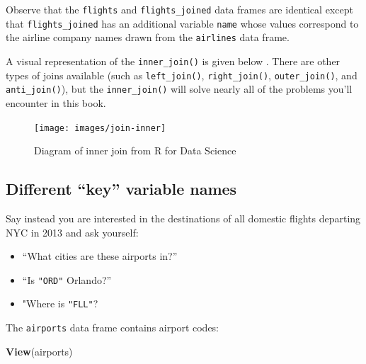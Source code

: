 \documentclass[12pt, krantz2,]{krantz}
\makeatletter
\newenvironment{Shaded}{\begin{snugshade}}{\end{snugshade}}
\newcommand{\DataTypeTok}[1]{\textcolor[rgb]{0.27,0.27,0.27}{#1}}
\newcommand{\KeywordTok}[1]{\textcolor[rgb]{0.27,0.27,0.27}{\textbf{#1}}}
\newcommand{\NormalTok}[1]{#1}
\newcommand{\OperatorTok}[1]{\textcolor[rgb]{0.43,0.43,0.43}{\textbf{#1}}}
\newcommand{\StringTok}[1]{\textcolor[rgb]{0.5,0.5,0.5}{#1}}
\providecommand{\tightlist}{%
  \setlength{\itemsep}{0pt}\setlength{\parskip}{0pt}}
\newenvironment{kframe}{%
\medskip{}
\setlength{\fboxsep}{.8em}
 \def\at@end@of@kframe{}%
 \ifinner\ifhmode%
  \def\at@end@of@kframe{\end{minipage}}%
  \begin{minipage}{\columnwidth}%
 \fi\fi%
 \def\FrameCommand##1{\hskip\@totalleftmargin \hskip-\fboxsep
 \colorbox{shadecolor}{##1}\hskip-\fboxsep
     \hskip-\linewidth \hskip-\@totalleftmargin \hskip\columnwidth}%
 \MakeFramed {\advance\hsize-\width
   \@totalleftmargin\z@ \linewidth\hsize
   \@setminipage}}%
 {\par\unskip\endMakeFramed%
 \at@end@of@kframe}
\renewenvironment{Shaded}{\begin{kframe}}{\end{kframe}}
\makeatother
\begin{document}
\begin{Shaded}
\end{Shaded}

Observe that the \texttt{flights} and \texttt{flights\_joined} data frames are identical except that \texttt{flights\_joined} has an additional variable \texttt{name} whose values correspond to the airline company names drawn from the \texttt{airlines} data frame.

A visual representation of the \texttt{inner\_join()} is given below \citep{rds2016}. There are other types of joins available (such as \texttt{left\_join()}, \texttt{right\_join()}, \texttt{outer\_join()}, and \texttt{anti\_join()}), but the \texttt{inner\_join()} will solve nearly all of the problems you'll encounter in this book.

\begin{figure}

{\centering \texttt{[image: images/join-inner]} 

}

\caption{Diagram of inner join from R for Data Science}\label{fig:ijdiagram}
\end{figure}

\hypertarget{diff-key}{%
\subsection{Different ``key'' variable names}\label{diff-key}}

Say instead you are interested in the destinations of all domestic flights departing NYC in 2013 and ask yourself:

\begin{itemize}
\tightlist
\item
  ``What cities are these airports in?''
\item
  ``Is \texttt{"ORD"} Orlando?''
\item
  "Where is \texttt{"FLL"}?
\end{itemize}

The \texttt{airports} data frame contains airport codes:

\begin{Shaded}
\begin{Highlighting}[]
\KeywordTok{View}\NormalTok{(airports)}
\end{Highlighting}
\end{Shaded}
\end{document}
